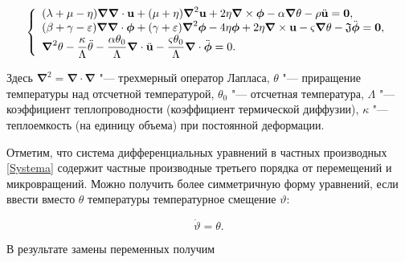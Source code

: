 \begin{equation}

\label{Systema}

\left\{

\begin{array}{l}

{(\lambda + \mu - \eta ){\boldsymbol\nabla}{\boldsymbol\nabla} \cdot {\bf u} + (\mu+ \eta){\boldsymbol\nabla}^2 {\bf u} + 2\eta {\boldsymbol\nabla} \times  {\boldsymbol\phi} - \alpha {\boldsymbol\nabla} \theta - \rho \ddot{{\bf u}}={\bf 0}},\\

{(\beta + \gamma - \varepsilon ){\boldsymbol\nabla} {\boldsymbol\nabla} \cdot {\boldsymbol\phi} + (\gamma+ \varepsilon){\boldsymbol\nabla}^2 {\boldsymbol\phi}-4\eta{\boldsymbol\phi} + 2\eta {\boldsymbol\nabla} \times  {\bf u} - \varsigma {\boldsymbol\nabla}\theta - {\mathfrak J} \ddot{{\boldsymbol\phi}}={\bf 0}},\\

{\boldsymbol\nabla}^2 \theta - \dfrac{\kappa}{\Lambda} \ddot{\theta} - \dfrac{\alpha\theta_0}{\Lambda}{\boldsymbol\nabla} \cdot \ddot{{\bf u}} - \dfrac{\varsigma\theta_0}{\Lambda}{\boldsymbol\nabla} \cdot \ddot{{\boldsymbol\phi}}=0.\\

\end{array}

\right.

\end{equation}

Здесь $\boldsymbol{\nabla}^2=\boldsymbol{\nabla} \cdot \boldsymbol{\nabla}$ "--- трехмерный оператор Лапласа, $\theta$ "--- приращение температуры над отсчетной температурой, $\theta_0$ "--- отсчетная температура, $\Lambda$ "--- коэффициент теплопроводности (коэффициент термической диффузии), $\kappa$ "--- теплоемкость (на единицу объема) при постоянной деформации.

Отметим, что система дифференциальных уравнений в частных производных \eqref{Systema} содержит частные производные третьего порядка от перемещений и микровращений. Можно получить более симметричную форму уравнений, если ввести вместо $\theta$ температуры температурное смещение $\vartheta$:

$$

\dot{\vartheta}=\theta.

$$

В результате замены переменных получим

